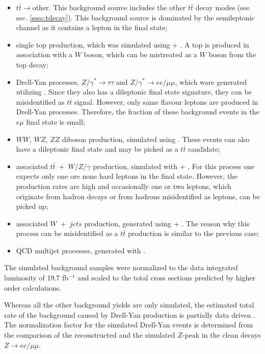 \begin{itemize}
 \item $t\bar{t}\rightarrow$other. This background source includes the other $t\bar{t}$ decay modes (see sec. \ref{ssec:tdecay}).
 This background source is dominated by the semileptonic channel as it contains a lepton in the final state;
 \item single top production, which was simulated using \Powheg + \PYTHIA. A top is produced in association with a $W$ boson, which can be 
 mistreated as a $W$ boson from the top decay;
 \item Drell-Yan processes, $Z/\gamma^{*} \rightarrow \tau\tau$ and $Z/\gamma^{*} \rightarrow ee/\mu\mu$, which ware generated utilizing \PYTHIA. 
 Since they also has a dileptonic final state signature, they can be misidentified as $t\bar{t}$ signal. However, only same flavour leptons 
 are produced in Drell-Yan processes. Therefore, the fraction of these
 background events in the $e\mu$ final state is small;
 \item $WW$, $WZ$, $ZZ$ diboson production, simulated using \PYTHIA. These events can also have a dileptonic final state and may be 
 picked as a $t\bar{t}$ candidate;
 \item associated $t\bar{t}\;+\; W/Z/\gamma$ production, simulated with \MG + \PYTHIA. For this process one expects only one ore none 
 hard leptons in the final state. However, the production rates are high and occasionally one or two leptons, which originate from hadron
 decays or from hadrons misidentified as leptons, can be picked up;
 \item associated $W\;+\;jets$ production, generated using \MG + \PYTHIA. The reason why this process can be misidentified as a $t\bar{t}$
 production is similar to the previous case;
 \item QCD multijet processes, generated with \PYTHIA.
\end{itemize}

The simulated background samples were normalized to the data integrated luminosity of 19.7 fb$^{-1}$ and
scaled to the total cross sections predicted by higher order calculations\cite{TWikiXSec}.

Whereas all the other background yields are only simulated, the estimated total rate of the background caused by Drell-Yan production is 
partially data driven \cite{Chatrchyan:2011nb}. The normalization factor for the simulated Drell-Yan events is determined 
from the comparison of the reconstructed and the simulated $Z$-peak in the clean decays $Z \rightarrow ee/\mu\mu$. 


